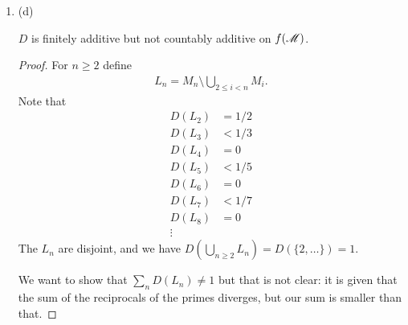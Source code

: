 \begin{enumerate}
\begin{enumerate}[label=(\alph*)]
\begin{proof}
      Use the explicit representation in 2.5.b

      We have
      \begin{align*}
        M_1 &= \{1, 2, 3, \ldots\} \\
        M_2 &= \{2, 4, 6, \ldots\} \\
        M_3 &= \{3, 6, 9, \ldots\} \\
        \vdots
      \end{align*}

    \end{proof}
    \begin{claim*}
      $D$ is completely determined on $f(\ms M)$ by the value it gives for each $a$ to the event that $m$ is
      divisible by $a$.

      In other words:

      Let $A \in f(\ms M)$. Then $D(A)$ can be computed knowing only the values $D(M_1), D(M_2), D(M_3), \ldots$.
    \end{claim*}

  \item (d)
    \begin{claim*}
      $D$ is finitely additive but not countably additive on $f(\ms M)$.
    \end{claim*}
    \begin{proof}
      For $n \geq 2$ define
      \begin{align*}
        L_n = M_n \setminus \bigcup_{2 \leq i < n} M_i.
      \end{align*}
      Note that
      \begin{align*}
        D(L_2) &= 1/2 \\
        D(L_3) &< 1/3 \\
        D(L_4) &= 0 \\
        D(L_5) &< 1/5 \\
        D(L_6) &= 0 \\
        D(L_7) &< 1/7 \\
        D(L_8) &= 0 \\
        \vdots
      \end{align*}
      The $L_n$ are disjoint, and we have $D(\bigcup_{n \geq 2} L_n) = D(\{2, \ldots\}) = 1$.

      We want to show that $\sum_n D(L_n) \neq 1$ but that is not clear: it is given that the sum of the
      reciprocals of the primes diverges, but our sum is smaller than that.

    \end{proof}


\end{enumerate}
\end{enumerate}
